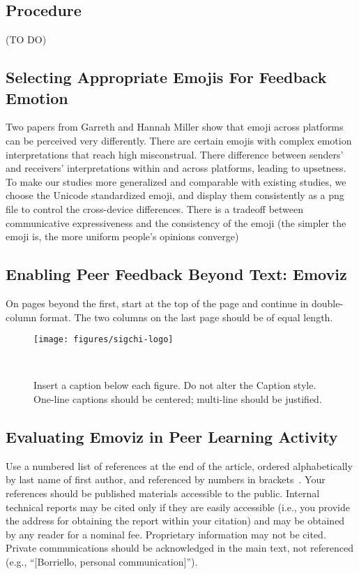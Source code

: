 \documentclass[chi_draft]{sigchi}
\begin{document}
\subsection{Procedure}

(TO DO)

\subsection{Selecting Appropriate Emojis For Feedback Emotion}
Two papers from Garreth and Hannah Miller show that emoji across platforms can be perceived very differently. There are certain emojis with complex emotion interpretations that reach high misconstrual.
There difference between senders’ and receivers’ interpretations within and across platforms, leading to upsetness. To make our studies more generalized and comparable with existing studies, we choose the Unicode standardized emoji, and display them consistently as a png file to control the cross-device differences. There is a tradeoff between communicative expressiveness and the consistency of the emoji (the simpler the emoji is, the more uniform people’s opinions converge)


\subsection{Enabling Peer Feedback Beyond Text: Emoviz}

On pages beyond the first, start at the top of the page and continue
in double-column format.  The two columns on the last page should be
of equal length.

\begin{figure}
\centering
  \texttt{[image: figures/sigchi-logo]}
  \caption{Insert a caption below each figure. Do not alter the
    Caption style.  One-line captions should be centered; multi-line
    should be justified. }~\label{fig:Emoviz Screenshot}
\end{figure}

\subsection{Evaluating Emoviz in Peer Learning Activity}

Use a numbered list of references at the end of the article, ordered
alphabetically by last name of first author, and referenced by numbers
in
brackets~\cite{acm_categories,ethics,Klemmer:2002:WSC:503376.503378}.
Your references should be published materials accessible to the
public. Internal technical reports may be cited only if they are
easily accessible (i.e., you provide the address for obtaining the
report within your citation) and may be obtained by any reader for a
nominal fee. Proprietary information may not be cited. Private
communications should be acknowledged in the main text, not referenced
(e.g., ``[Borriello, personal communication]'').
\end{document}
